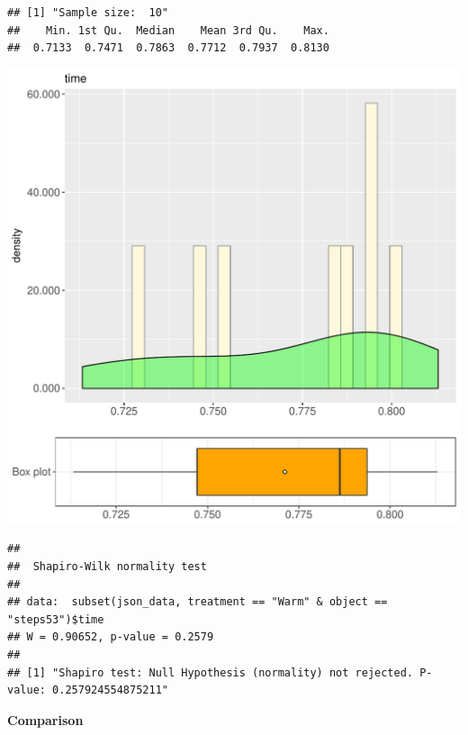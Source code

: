 \documentclass{article}\usepackage[]{graphicx}\usepackage[]{color}
\makeatletter
\def\maxwidth{ %
  \ifdim\Gin@nat@width>\linewidth
    \linewidth
  \else
    \Gin@nat@width
  \fi
}
\newenvironment{kframe}{%
 \def\at@end@of@kframe{}%
 \ifinner\ifhmode%
  \def\at@end@of@kframe{\end{minipage}}%
  \begin{minipage}{\columnwidth}%
 \fi\fi%
 \def\FrameCommand##1{\hskip\@totalleftmargin \hskip-\fboxsep
 \colorbox{shadecolor}{##1}\hskip-\fboxsep
     \hskip-\linewidth \hskip-\@totalleftmargin \hskip\columnwidth}%
 \MakeFramed {\advance\hsize-\width
   \@totalleftmargin\z@ \linewidth\hsize
   \@setminipage}}%
 {\par\unskip\endMakeFramed%
 \at@end@of@kframe}
\newenvironment{knitrout}{}{} %
\makeatother
\begin{document}
\begin{knitrout}
\color{fgcolor}\begin{kframe}
\begin{verbatim}
## [1] "Sample size:  10"
##    Min. 1st Qu.  Median    Mean 3rd Qu.    Max. 
##  0.7133  0.7471  0.7863  0.7712  0.7937  0.8130
\end{verbatim}
\end{kframe}
\includegraphics[width=\maxwidth]{figure/RH1_Warm_steps53-1} 
\begin{kframe}\begin{verbatim}
## 
## 	Shapiro-Wilk normality test
## 
## data:  subset(json_data, treatment == "Warm" & object == "steps53")$time
## W = 0.90652, p-value = 0.2579
## 
## [1] "Shapiro test: Null Hypothesis (normality) not rejected. P-value: 0.257924554875211"
\end{verbatim}
\end{kframe}
\end{knitrout}
  
 \textbf{Comparison}
  
\end{document}
